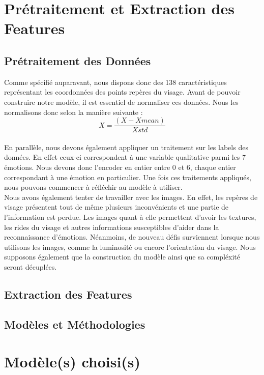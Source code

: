 \documentclass{rapport}
\begin{document}
\section{Prétraitement et Extraction des Features}
\subsection{Prétraitement des Données}
Comme spécifié auparavant, nous dispons donc des 138 caractéristiques représentant les coordonnées des points repères du visage. 
Avant de pouvoir construire notre modèle, il est essentiel de normaliser ces données. 
Nous les normalisons donc selon la manière suivante \cite{kalapalaFacialExpressionRecognition2020} :\\ 

\begin{equation}
	X = \frac{(X - Xmean)} {Xstd}
\end{equation}\\

En parallèle, nous devons également appliquer un traitement sur les labels des données. 
En effet ceux-ci correspondent à une variable qualitative parmi les 7 émotions. 
Nous devons donc l'encoder en entier entre 0 et 6, chaque entier correspondant à une émotion en particulier. 
Une fois ces traitements appliqués, nous pouvons commencer à réfléchir au modèle à utiliser.\\

Nous avons également tenter de travailler avec les images. 
En effet, les repères de visage présentent tout de même plusieurs inconvénients et une partie de l'information est perdue. 
Les images quant à elle permettent d'avoir les textures, 
les rides du visage et autres informations susceptibles d'aider dans la reconnaissance d'émotions. 
Néanmoins, de nouveau défis surviennent lorsque nous utilisons les images, comme la luminosité ou encore l'orientation du visage. 
Nous supposons également que la construction du modèle ainsi que sa compléxité seront décuplées.

\subsection{Extraction des Features}
\subsection{Modèles et Méthodologies}

\section{Modèle(s) choisi(s)}
\end{document}
